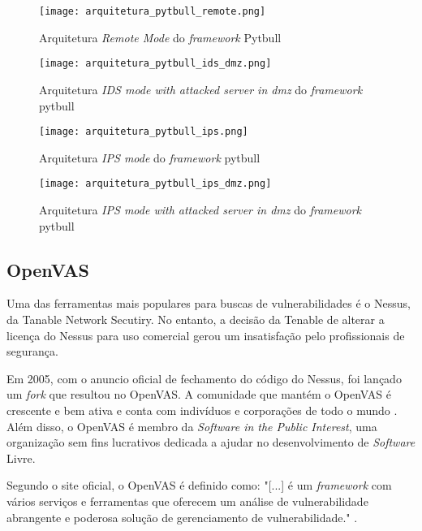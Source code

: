 \begin{figure}[htb]
    \centering
    \caption{Arquitetura \textit{Remote Mode} do \textit{framework} Pytbull}
    \texttt{[image: arquitetura\_pytbull\_remote.png]}
    \label{fig:pytbull-remote}
\end{figure}

\begin{figure}[htb]
    \centering
    \caption{Arquitetura \textit{IDS mode with attacked server in dmz} do \textit{framework} pytbull}
    \texttt{[image: arquitetura\_pytbull\_ids\_dmz.png]}
    \label{fig:pytbull-ids-dmz}
\end{figure}

\begin{figure}[htb]
    \centering
    \caption{Arquitetura \textit{IPS mode} do \textit{framework} pytbull}
    \texttt{[image: arquitetura\_pytbull\_ips.png]}
    \label{fig:pytbull-ips}
\end{figure}

\begin{figure}[htb]
    \centering
    \caption{Arquitetura \textit{IPS mode with attacked server in dmz} do \textit{framework} pytbull}
    \texttt{[image: arquitetura\_pytbull\_ips\_dmz.png]}
    \label{fig:pytbull-ips-dmz}
\end{figure}

\subsection{OpenVAS} \label{sec:openvas}

Uma das ferramentas mais populares para buscas de vulnerabilidades é o Nessus, da Tanable Network Secutiry. No entanto, a decisão da Tenable de alterar a licença do Nessus para uso comercial gerou um insatisfação pelo profissionais de segurança. 

Em 2005, com o anuncio oficial de fechamento do código do Nessus, foi lançado um \textit{fork} que resultou no OpenVAS. A comunidade que mantém o OpenVAS é crescente e bem ativa e conta com indivíduos e corporações de todo o mundo \cite{openvas:tim}. Além disso, o OpenVAS é membro da \textit{Software in the Public Interest}, uma organização sem fins lucrativos dedicada a ajudar no desenvolvimento de \textit{Software} Livre.

Segundo o site oficial, o OpenVAS é definido como: "[...] é um \textit{framework} com vários serviços e ferramentas que oferecem um análise de vulnerabilidade abrangente e poderosa solução de gerenciamento de vulnerabilidade." \cite{openvas}.


